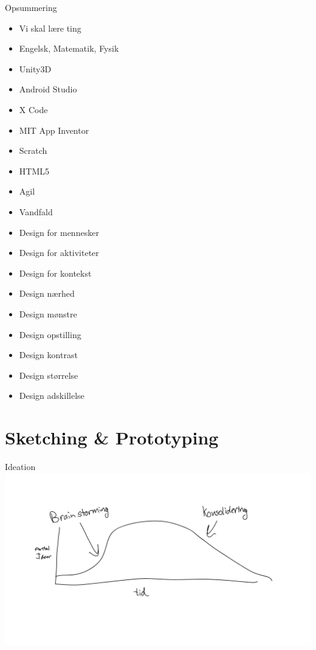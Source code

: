 \documentclass[10pt]{beamer}
\begin{document}
\begin{frame}{Opsummering}
	\begin{multicols}{2}
		\begin{itemize}
			\item Vi skal lære ting
			\item Engelsk, Matematik, Fysik
			\item Unity3D
			\item Android Studio
			\item X Code
			\item MIT App Inventor
			\item Scratch
			\item HTML5
			\item Agil
			\item Vandfald
			\item Design for mennesker
			\item Design for aktiviteter
			\item Design for kontekst
			\item Design nærhed
			\item Design mønstre
			\item Design opstilling
			\item Design kontrast
			\item Design størrelse
			\item Design adskillelse
		\end{itemize}
	\end{multicols}
\end{frame}
\section{Sketching \& Prototyping}

\begin{frame}{Ideation}
		\includegraphics[scale=0.18]{img/ideation.pdf}
\end{frame}
\end{document}
